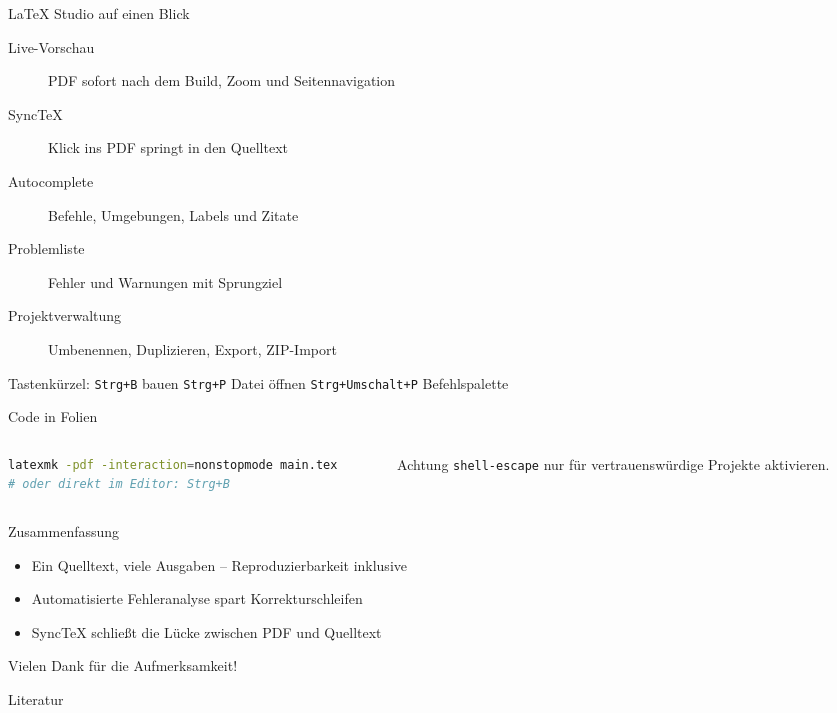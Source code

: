 \documentclass[aspectratio=169,11pt]{beamer}
\begin{document}
\begin{frame}{LaTeX Studio auf einen Blick}
  \begin{description}
    \item[Live-Vorschau] PDF sofort nach dem Build, Zoom und Seitennavigation
    \item[SyncTeX] Klick ins PDF springt in den Quelltext
    \item[Autocomplete] Befehle, Umgebungen, Labels und Zitate
    \item[Problemliste] Fehler und Warnungen mit Sprungziel
    \item[Projektverwaltung] Umbenennen, Duplizieren, Export, ZIP-Import
  \end{description}

  \vspace{0.8em}
  \centering\small Tastenkürzel: \texttt{Strg+B} bauen \quad
  \texttt{Strg+P} Datei öffnen \quad \texttt{Strg+Umschalt+P} Befehlspalette
\end{frame}

\begin{frame}[fragile]{Code in Folien}
  \begin{columns}[T]
    \begin{column}{0.52\textwidth}
      \begin{lstlisting}[basicstyle=\ttfamily\tiny, frame=single,
                          language=bash, numbers=none]
latexmk -pdf -interaction=nonstopmode main.tex
# oder direkt im Editor: Strg+B
      \end{lstlisting}
    \end{column}
    \begin{column}{0.44\textwidth}
      \begin{alertblock}{Achtung}
        \texttt{shell-escape} nur für vertrauenswürdige Projekte
        aktivieren.
      \end{alertblock}
    \end{column}
  \end{columns}
\end{frame}

\begin{frame}{Zusammenfassung}
  \begin{itemize}
    \item Ein Quelltext, viele Ausgaben -- Reproduzierbarkeit inklusive
    \item Automatisierte Fehleranalyse spart Korrekturschleifen
    \item SyncTeX schließt die Lücke zwischen PDF und Quelltext
  \end{itemize}

  \vspace{1.2em}
  \centering
  \Huge\color{accent} Vielen Dank für die Aufmerksamkeit!
\end{frame}

\begin{frame}[allowframebreaks]{Literatur}
  \begingroup
  \small
  
  
  \endgroup
\end{frame}
\end{document}
